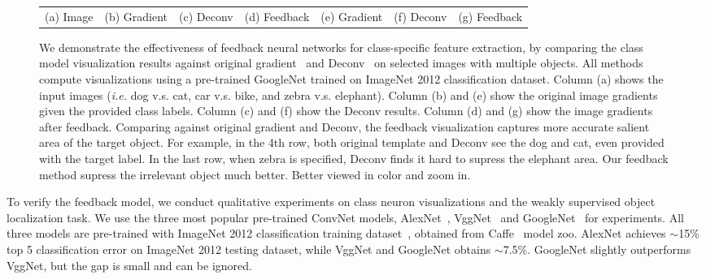 \begin{figure}
\begin{center}
\begin{tabular}{ccccccc}
{\small (a) Image} &
{\small (b) Gradient} &
{\small (c) Deconv} &
{\small (d) Feedback} &
{\small (e) Gradient} &
{\small (f) Deconv} &
{\small (g) Feedback} \\
\end{tabular}
\caption{We demonstrate the effectiveness of feedback neural networks for class-specific feature extraction, by comparing the class model visualization results against original gradient~\cite{simonyan2013deep} and Deconv~\cite{zeiler2014visualizing} on selected images with multiple objects. All methods compute visualizations using a pre-trained GoogleNet trained on ImageNet 2012 classification dataset. Column (a) shows the input images (\emph{i.e.} dog v.s. cat, car v.s. bike, and zebra v.s. elephant). Column (b) and (e) show the original image gradients given the provided class labels. Column (c) and (f) show the Deconv results. Column (d) and (g) show the image gradients after feedback. Comparing against original gradient and Deconv, the feedback visualization captures more accurate salient area of the target object. For example, in the 4th row, both original template and Deconv see the dog and cat, even provided with the target label. In the last row, when zebra is specified, Deconv finds it hard to supress the elephant area. Our feedback method supress the irrelevant object much better. Better viewed in color and zoom in.}
\label{fig:examples}
\end{center}
\end{figure}

To verify the feedback model, we conduct qualitative experiments on class neuron visualizations and the weakly supervised object localization task. We use the three most popular pre-trained ConvNet models, AlexNet~\cite{Krizhevsky2012ImageNet}, VggNet~\cite{simonyan2013deep} and GoogleNet~\cite{Szegedy2014Going} for experiments. All three models are pre-trained with ImageNet 2012 classification training dataset~\cite{deng2009imagenet}, obtained from Caffe~\cite{jia2014caffe} model zoo. AlexNet achieves $\sim$15\% top 5 classification error on ImageNet 2012 testing dataset, while VggNet and GoogleNet obtains $\sim$7.5\%. GoogleNet slightly outperforms VggNet, but the gap is small and can be ignored.

